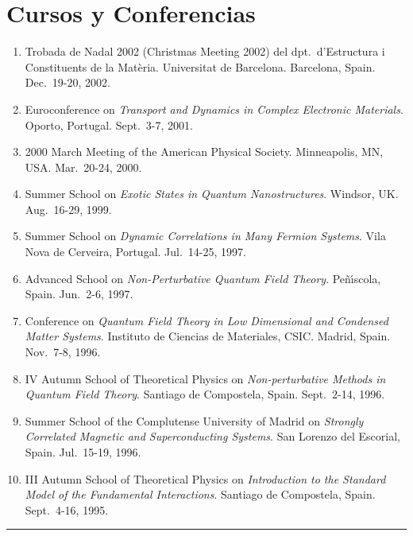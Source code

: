 \documentclass{article}
\begin{document}

\section*{Cursos y Conferencias}

\begin{enumerate}
\item
Trobada de Nadal 2002 (Christmas Meeting 2002) del dpt.~d'Estructura 
i Constituents de la Mat\`eria. 
Universitat de Barcelona.
Barcelona, Spain.
Dec.~19-20, 2002.

\item
Euroconference on 
{\sl Transport and Dynamics in Complex Electronic Materials}.
Oporto, Portugal. 
Sept.~3-7, 2001. 

\item 
2000 March Meeting of the American Physical Society. 
Minneapolis, MN, USA. 
Mar.~20-24, 2000.

\item 
Summer School on 
{\it Exotic States in Quantum Nanostructures}.
Windsor, UK. 
Aug.~16-29, 1999.

\item 
Summer School on 
{\it Dynamic Correlations in Many Fermion Systems}. 
Vila Nova de Cerveira, Portugal. 
Jul.~14-25, 1997.

\item
Advanced School on {\it Non-Perturbative Quantum Field Theory}. 
Pe\~n\'{\i}scola, Spain. 
Jun.~2-6, 1997.

\item 
Conference on 
{\it Quantum Field Theory in Low Dimensional and Condensed Matter Systems}.
Instituto de Ciencias de Materiales, CSIC. Madrid, Spain. 
Nov.~7-8, 1996.

\item  
IV Autumn School of Theoretical Physics on
{\it Non-perturbative Methods in Quantum Field Theory}.
Santiago de Compostela, Spain. 
Sept.~2-14, 1996.

\item  
Summer School of the Complutense University of Madrid on
{\it Strongly Correlated Magnetic and Superconducting Systems}.
San Lorenzo del Escorial, Spain. 
Jul.~15-19, 1996.

\item  
III Autumn School of Theoretical Physics on
{\it Introduction to the Standard Model of the Fundamental Interactions}.
Santiago de Compostela, Spain. 
Sept.~4-16, 1995. 
\end{enumerate}


\hrule 

\bigskip

\noindent
\version
\end{document}
